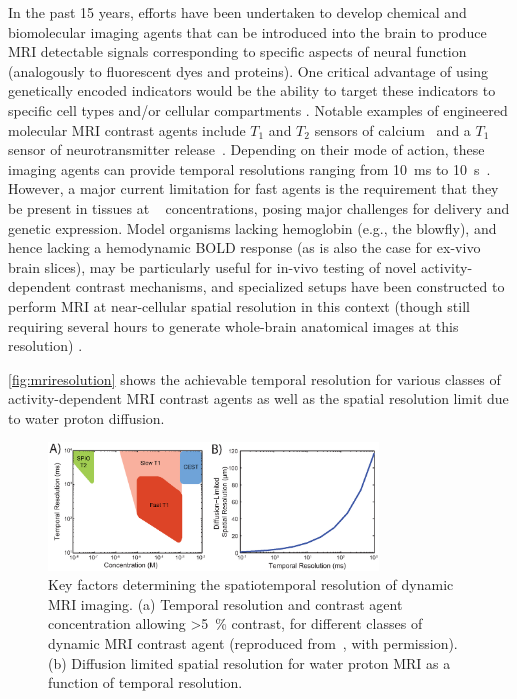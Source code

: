 In the past 15 years, efforts have been undertaken to develop chemical and biomolecular imaging agents that can be introduced into the brain to produce MRI detectable signals corresponding to specific aspects of neural function (analogously to fluorescent dyes and proteins). One critical advantage of using genetically encoded indicators would be the ability to target these indicators to specific cell types \cite{madisen2009robust, luo2008genetic} and/or cellular compartments \cite{arnold2007polarized, el2001polarized, correa2009rapid, jacobs2003soma, vacher2008localization, boeckers2005c, feinberg2008gfp, yamagata2012transgenic}. Notable examples of engineered molecular MRI contrast agents include $T_1$ and $T_2$ sensors of calcium~\cite{atanasijevic06,li99} and a $T_1$ sensor of neurotransmitter release~\cite{shapiro10}.
Depending on their mode of action, these imaging agents can provide temporal resolutions ranging from \SI{10}{\milli\second} to \SI{10}{\second}~\cite{shapiro06}.
However, a major current limitation for fast agents is the requirement that they be present in tissues at \si{\micro\Molar} concentrations, posing major challenges for delivery and genetic expression. Model organisms lacking hemoglobin (e.g., the blowfly), and hence lacking a hemodynamic BOLD response (as is also the case for ex-vivo brain slices), may be particularly useful for in-vivo testing of novel activity-dependent contrast mechanisms, and specialized setups have been constructed to perform MRI at near-cellular spatial resolution in this context (though still requiring several hours to generate whole-brain anatomical images at this resolution) \cite{jasanoff2002vivo}.

\autoref{fig:mriresolution} shows the achievable temporal resolution for various classes of activity-dependent MRI contrast agents as well as the spatial resolution limit due to water proton diffusion.

\begin{figure}[htbp]
\caption{Key factors determining the spatiotemporal resolution of dynamic MRI imaging. (a) Temporal resolution and contrast agent concentration allowing \SI{>5}{\percent} contrast, for different classes of dynamic MRI contrast agent (reproduced from~\cite{shapiro06}, with permission). (b) Diffusion limited spatial resolution for water proton MRI as a function of temporal resolution.}
\label{fig:mriresolution}
\centering
\includegraphics[width=0.78\textwidth]{figs/Fig6.eps}
\end{figure}

